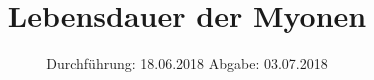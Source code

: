

\subject{V01}
\title{Lebensdauer der Myonen}
\date{
\centering
  Durchführung: 18.06.2018
  \hspace{3em}
  Abgabe: 03.07.2018
}



\maketitle
\thispagestyle{empty}
\tableofcontents
\newpage



%




\printbibliography


